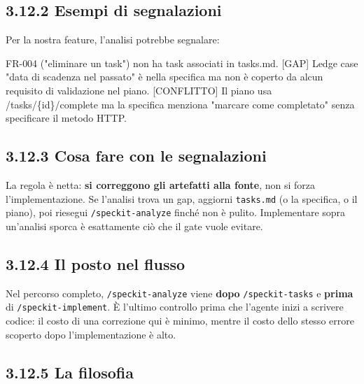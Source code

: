 \documentclass[
  italian,
  10pt,
]{book}
\newenvironment{Shaded}{\begin{snugshade}}{\end{snugshade}}
\newcommand{\NormalTok}[1]{#1}
\begin{document}
\subsection{3.12.2 Esempi di segnalazioni}\label{esempi-di-segnalazioni}

Per la nostra feature, l'analisi potrebbe segnalare:

\begin{Shaded}
\begin{Highlighting}[]
\NormalTok{[GAP] FR{-}004 ("eliminare un task") non ha task associati in tasks.md.}
\NormalTok{[GAP] L\textquotesingle{}edge case "data di scadenza nel passato" è nella specifica ma non}
\NormalTok{      è coperto da alcun requisito di validazione nel piano.}
\NormalTok{[CONFLITTO] Il piano usa /tasks/\{id\}/complete ma la specifica menziona}
\NormalTok{      "marcare come completato" senza specificare il metodo HTTP.}
\end{Highlighting}
\end{Shaded}

\subsection{3.12.3 Cosa fare con le
segnalazioni}\label{cosa-fare-con-le-segnalazioni}

La regola è netta: \textbf{si correggono gli artefatti alla fonte}, non
si forza l'implementazione. Se l'analisi trova un gap, aggiorni
\texttt{tasks.md} (o la specifica, o il piano), poi riesegui
\texttt{/speckit-analyze} finché non è pulito. Implementare sopra
un'analisi sporca è esattamente ciò che il gate vuole evitare.

\subsection{3.12.4 Il posto nel flusso}\label{il-posto-nel-flusso}

Nel percorso completo, \texttt{/speckit-analyze} viene \textbf{dopo}
\texttt{/speckit-tasks} e \textbf{prima} di \texttt{/speckit-implement}.
È l'ultimo controllo prima che l'agente inizi a scrivere codice: il
costo di una correzione qui è minimo, mentre il costo dello stesso
errore scoperto dopo l'implementazione è alto.

\subsection{3.12.5 La filosofia}\label{la-filosofia}
\end{document}
